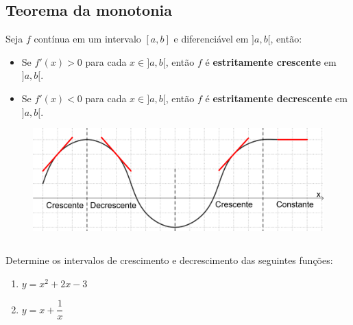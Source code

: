 \subsection{Teorema da monotonia}
\begin{frame}
    \begin{theorem}
        Seja $f$ contínua em um intervalo $[a,b]$ e diferenciável em $]a,b[$, então:
        \begin{itemize}
            \item Se $f'(x)>0$ para cada $x\in]a,b[$, então $f$ é \textbf{estritamente crescente} em $]a,b[$.
            \item Se $f'(x)<0$ para cada $x\in]a,b[$, então $f$ é \textbf{estritamente decrescente} em $]a,b[$.
        \end{itemize}
    \end{theorem}
    \begin{figure}
        \centering
        \includegraphics[width=.9\linewidth]{figuras/fig4.png}
    \end{figure}
\end{frame}

\begin{frame}{}
    \vspace{-15pt}
    \begin{columns}
        \begin{example}
            Determine os intervalos de crescimento e decrescimento das seguintes funções:
            \begin{enumerate}[a]
                \item<only@+> $y = x^2 +2x -3$
                \item<only@+-> $y = x + \dfrac{1}{x}$
            \end{enumerate}
    \end{example}        
    \end{columns}

\end{frame}

